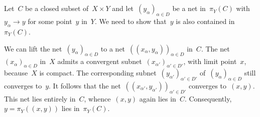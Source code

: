 \subsection{}

Let~$C$ be a closed subset of~$X × Y$ and let~$(y_α)_{α ∈ D}$ be a net in~$π_Y(C)$ with~$y_α \to y$ for some point~$y$ in~$Y$.
We need to show that~$y$ is also contained in~$π_Y(C)$.

We can lift the net~$(y_α)_{α ∈ D}$ to a net~$( (x_α, y_α) )_{α ∈ D}$ in~$C$.
The net~$(x_α)_{α ∈ D}$ in~$X$ admits a convergent subnet~$(x_{α'})_{α' ∈ D'}$, with limit point~$x$, because~$X$ is compact.
The corresponding subnet~$(y_{α'})_{α' ∈ D'}$ of~$(y_α)_{α ∈ D}$ still converges to~$y$.
It follows that the net~$( (x_{α'}, y_{α'}) )_{α' ∈ D'}$ converges to~$(x, y)$.
This net lies entirely in~$C$, whence~$(x, y)$ again lies in~$C$.
Consequently,~$y = π_Y( (x, y) )$ lies in~$π_Y(C)$.
